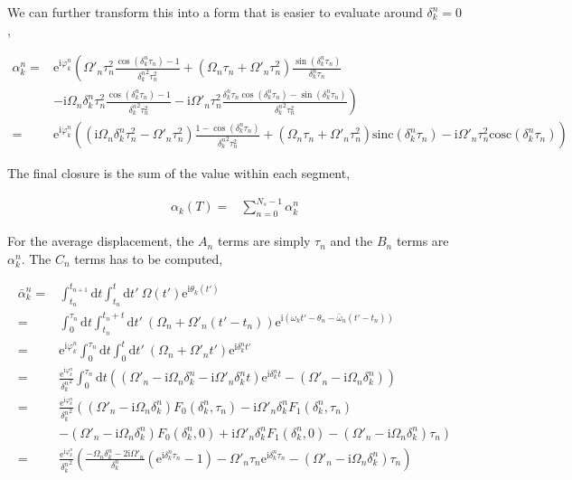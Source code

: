 \documentclass[10pt,fleqn]{article}
\newcommand{\ud}{\mathrm{d}}
\newcommand{\ue}{\mathrm{e}}
\newcommand{\ui}{\mathrm{i}}
\newcommand{\eqar}[1]
{
  \begin{align*}
    #1
  \end{align*}
}
\newcommand{\paren}[1]{{\left({#1}\right)}}
\newcommand{\lparen}[1]{{\left({#1}\right.}}
\newcommand{\rparen}[1]{{\left.{#1}\right)}}
\begin{document}
We can further transform this into a form that is easier to evaluate
around $\delta_k^n=0$,
\eqar{
  \alpha_k^n=&\ue^{\ui\varphi_k^n}\lparen{
    \Omega'_n\tau_n^2\frac{\cos\paren{\delta_k^n\tau_n}-1}{{\delta_k^n}^2\tau_n^2}
    +\paren{\Omega_n\tau_n+\Omega'_n\tau_n^2}\frac{\sin\paren{\delta_k^n\tau_n}}{\delta_k^n\tau_n}
  }\\
  &\rparen{
    -\ui\Omega_n\delta_k^n\tau_n^2\frac{\cos\paren{\delta_k^n\tau_n}-1}{{\delta_k^n}^2\tau_n^2}
    -\ui\Omega'_n\tau_n^2\frac{\delta_k^n\tau_n\cos\paren{\delta_k^n\tau_n}-\sin\paren{\delta_k^n\tau_n}}{{\delta_k^n}^2\tau_n^2}
  }\\
  =&\ue^{\ui\varphi_k^n}\paren{
    \paren{\ui\Omega_n\delta_k^n\tau_n^2-\Omega'_n\tau_n^2}\frac{1-\cos\paren{\delta_k^n\tau_n}}{{\delta_k^n}^2\tau_n^2}
    +\paren{\Omega_n\tau_n+\Omega'_n\tau_n^2}\mathrm{sinc}\paren{\delta_k^n\tau_n}
    -\ui\Omega'_n\tau_n^2\mathrm{cosc}\paren{\delta_k^n\tau_n}
  }
}

The final closure is the sum of the value within each segment,
\eqar{
  \alpha_k(T)=&\sum_{n=0}^{N_s-1}\alpha_k^n
}

For the average displacement, the $A_n$ terms are simply $\tau_n$ and the $B_n$ terms
are $\alpha_k^n$. The $C_n$ terms has to be computed,
\eqar{
  \bar\alpha_k^n=&\int_{t_{n}}^{t_{n+1}}\!\!\ud t\int_{t_n}^{t}\!\!\ud t'\ \Omega(t')\ue^{\ui\theta_k(t')}\\
  =&\int_{0}^{\tau_n}\!\!\ud t\int_{t_n}^{t_n+t}\!\!\ud t'\ \paren{\Omega_n+\Omega'_n\paren{t'-t_n}}\ue^{\ui\paren{\omega_kt'-\theta_n-\bar\omega_n\paren{t'-t_n}}}\\
  =&\ue^{\ui\varphi_k^n}\int_{0}^{\tau_n}\!\!\ud t\int_{0}^{t}\!\!\ud t'\ \paren{\Omega_n+\Omega'_n t'}\ue^{\ui\delta_k^nt'}\\
  =&\frac{\ue^{\ui\varphi_k^n}}{{\delta_k^n}^2}\int_{0}^{\tau_n}\!\!\ud t
  \paren{\paren{\Omega'_n-\ui\Omega_n\delta_k^n-\ui\Omega'_n\delta_k^nt}\ue^{\ui\delta_k^nt}-\paren{\Omega'_n-\ui\Omega_n\delta_k^n}}\\
  =&\frac{\ue^{\ui\varphi_k^n}}{{\delta_k^n}^2}
  \lparen{\paren{\Omega'_n-\ui\Omega_n\delta_k^n}F_0(\delta_k^n, \tau_n)-\ui\Omega'_n\delta_k^nF_1(\delta_k^n, \tau_n)}\\
  &\rparen{-\paren{\Omega'_n-\ui\Omega_n\delta_k^n}F_0(\delta_k^n, 0)+\ui\Omega'_n\delta_k^nF_1(\delta_k^n, 0)-\paren{\Omega'_n-\ui\Omega_n\delta_k^n}\tau_n}\\
  =&\frac{\ue^{\ui\varphi_k^n}}{{\delta_k^n}^2}
  \paren{\frac{-\Omega_n\delta_k^n-2\ui\Omega'_n}{{\delta_k^n}}\paren{\ue^{\ui{\delta_k^n}\tau_n} - 1}-\Omega'_n\tau_n\ue^{\ui{\delta_k^n}\tau_n}-\paren{\Omega'_n-\ui\Omega_n\delta_k^n}\tau_n}
}
\end{document}
